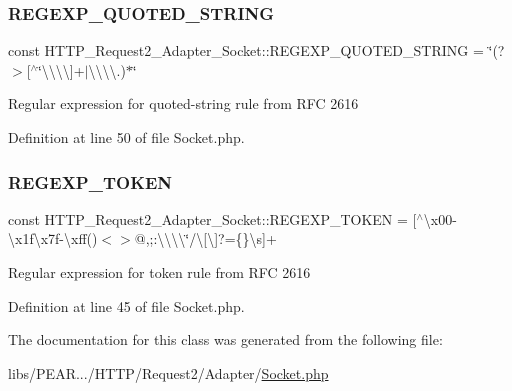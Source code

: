 \subsubsection{\texorpdfstring{R\+E\+G\+E\+X\+P\+\_\+\+Q\+U\+O\+T\+E\+D\+\_\+\+S\+T\+R\+I\+NG}{REGEXP\_QUOTED\_STRING}}
{\footnotesize\ttfamily const H\+T\+T\+P\+\_\+\+Request2\+\_\+\+Adapter\+\_\+\+Socket\+::\+R\+E\+G\+E\+X\+P\+\_\+\+Q\+U\+O\+T\+E\+D\+\_\+\+S\+T\+R\+I\+NG = \textquotesingle{}\char`\"{}(?$>$\mbox{[}$^\wedge$\char`\"{}\textbackslash{}\textbackslash{}\textbackslash{}\textbackslash{}\mbox{]}+$\vert$\textbackslash{}\textbackslash{}\textbackslash{}\textbackslash{}.)$\ast$\char`\"{}\textquotesingle{}}

Regular expression for \textquotesingle{}quoted-\/string\textquotesingle{} rule from R\+FC 2616 

Definition at line 50 of file Socket.\+php.

\hypertarget{classHTTP__Request2__Adapter__Socket_a56beacc9218c6048c7f9ad5af80959eb}{}\label{classHTTP__Request2__Adapter__Socket_a56beacc9218c6048c7f9ad5af80959eb} 
\subsubsection{\texorpdfstring{R\+E\+G\+E\+X\+P\+\_\+\+T\+O\+K\+EN}{REGEXP\_TOKEN}}
{\footnotesize\ttfamily const H\+T\+T\+P\+\_\+\+Request2\+\_\+\+Adapter\+\_\+\+Socket\+::\+R\+E\+G\+E\+X\+P\+\_\+\+T\+O\+K\+EN = \textquotesingle{}\mbox{[}$^\wedge$\textbackslash{}x00-\/\textbackslash{}x1f\textbackslash{}x7f-\/\textbackslash{}xff()$<$$>$@,;\+:\textbackslash{}\textbackslash{}\textbackslash{}\textbackslash{}\char`\"{}/\textbackslash{}\mbox{[}\textbackslash{}\mbox{]}?=\{\}\textbackslash{}s\mbox{]}+\textquotesingle{}}

Regular expression for \textquotesingle{}token\textquotesingle{} rule from R\+FC 2616 

Definition at line 45 of file Socket.\+php.



The documentation for this class was generated from the following file\+:\begin{DoxyCompactItemize}
\item 
libs/\+P\+E\+A\+R.../\+H\+T\+T\+P/\+Request2/\+Adapter/\hyperlink{Socket_8php}{Socket.\+php}\end{DoxyCompactItemize}
